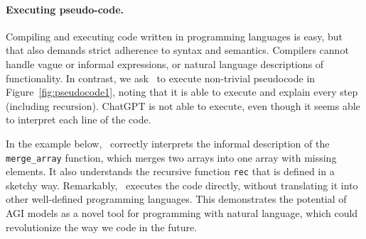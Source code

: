 
\paragraph{Executing pseudo-code.}
Compiling and executing code written in programming languages is easy, but that also demands strict adherence to syntax and semantics. Compilers cannot handle vague or informal expressions, or natural language descriptions of functionality. 
In contrast, we ask \DV\ to execute non-trivial pseudocode in Figure~\ref{fig:pseudocode1}, noting that it is able to execute and explain every step (including recursion). ChatGPT is not able to execute, even though it seems able to interpret each line of the code.

In the example below, \DV\ correctly interprets the informal description of the \texttt{merge\_array} function, which merges two arrays into one array with missing elements. It also understands the recursive function \texttt{rec} that is defined in a sketchy way. Remarkably, \DV \ executes the code directly, without translating it into other well-defined programming languages. This demonstrates the potential of AGI models as a novel tool for programming with natural language, which could revolutionize the way we code in the future.


